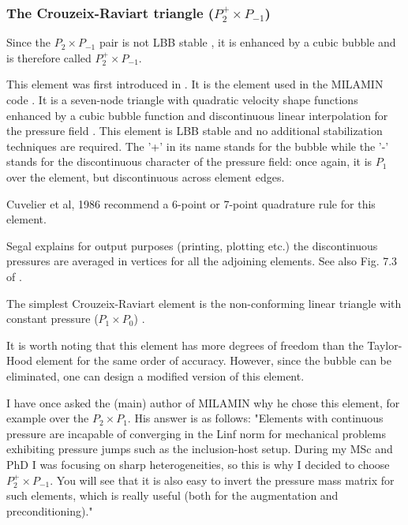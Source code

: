 \subsubsection{The Crouzeix-Raviart triangle ($P_2^+\times P_{-1}$)}
\label{sec:crouzeix-raviart}

Since the $P_2\times P_{-1}$ pair is not LBB stable \cite[p179]{reddybook2}, 
it is enhanced by a cubic bubble and is therefore called $P_2^+\times P_{-1}$. 

This element was first introduced in \cite{crra73}.
It is the element used in the MILAMIN code \cite{daks08}.
It is a seven-node triangle with quadratic velocity shape 
functions enhanced by a cubic bubble function and discontinuous linear interpolation for 
the pressure field \cite{cuss86}. 
This element is LBB stable and no additional stabilization techniques are required\cite{elsw}.
The '+' in its name stands for the bubble while the '-' stands for the discontinuous
character of the pressure field: once again, it is $P_1$ over the element, but discontinuous
across element edges.

\begin{remark}
Cuvelier et al, 1986 \cite{cuss86} recommend a 6-point or 7-point quadrature rule for this element.
\end{remark}

\begin{remark}
Segal \cite{segal} explains 
for output purposes (printing, plotting etc.) the discontinuous pressures are averaged 
in vertices for all the adjoining elements. See also Fig. 7.3 of \cite{cuss86}.
\end{remark}

\begin{remark}
The simplest Crouzeix-Raviart element is the non-conforming linear triangle 
with constant pressure ($P_1\times P_0$) \cite{cuss86}. 
\end{remark}

It is worth noting that this element has more degrees of freedom  than the 
Taylor-Hood element for the same order of accuracy. However, since the 
bubble can be eliminated, one can design a modified version of this element.


\begin{remark}
I have once asked the (main) author of MILAMIN why he chose this element, for 
example over the $P_2\times P_1$. His answer is as follows:
"Elements with continuous pressure  are incapable of converging in the Linf 
norm for mechanical problems exhibiting pressure jumps such as the inclusion-host setup. 
During my MSc and PhD I was focusing on sharp heterogeneities, so this is why I decided 
to choose $P_2^+\times P_{-1}$. 
You will see that it is also easy to invert the pressure mass matrix for such elements, 
which is really useful (both for the augmentation and preconditioning)."
\end{remark}

